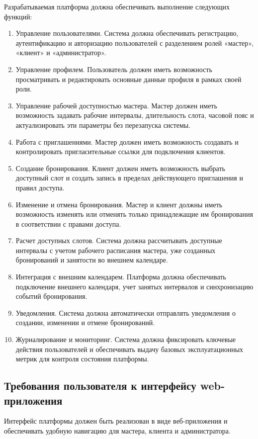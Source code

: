 Разрабатываемая платформа должна обеспечивать выполнение следующих функций:
\begin{enumerate}
\item Управление пользователями. Система должна обеспечивать регистрацию, аутентификацию и авторизацию пользователей с разделением ролей «мастер», «клиент» и «администратор».
\item Управление профилем. Пользователь должен иметь возможность просматривать и редактировать основные данные профиля в рамках своей роли.
\item Управление рабочей доступностью мастера. Мастер должен иметь возможность задавать рабочие интервалы, длительность слота, часовой пояс и актуализировать эти параметры без перезапуска системы.
\item Работа с приглашениями. Мастер должен иметь возможность создавать и контролировать пригласительные ссылки для подключения клиентов.
\item Создание бронирования. Клиент должен иметь возможность выбрать доступный слот и создать запись в пределах действующего приглашения и правил доступа.
\item Изменение и отмена бронирования. Мастер и клиент должны иметь возможность изменять или отменять только принадлежащие им бронирования в соответствии с правами доступа.
\item Расчет доступных слотов. Система должна рассчитывать доступные интервалы с учетом рабочего расписания мастера, уже созданных бронирований и занятости во внешнем календаре.
\item Интеграция с внешним календарем. Платформа должна обеспечивать подключение внешнего календаря, учет занятых интервалов и синхронизацию событий бронирования.
\item Уведомления. Система должна автоматически отправлять уведомления о создании, изменении и отмене бронирований.
\item Журналирование и мониторинг. Система должна фиксировать ключевые действия пользователей и обеспечивать выдачу базовых эксплуатационных метрик для контроля состояния платформы.
\end{enumerate}

\subsection{Требования пользователя к интерфейсу web-приложения}

Интерфейс платформы должен быть реализован в виде веб-приложения и обеспечивать удобную навигацию для мастера, клиента и администратора.

